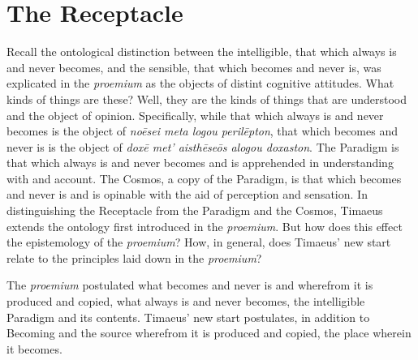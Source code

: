 

\section{The Receptacle} %
\label{sec:the_receptacle}



Recall the ontological distinction between the intelligible, that which always is and never becomes, and the sensible, that which becomes and never is, was explicated in the \emph{proemium} as the objects of distint cognitive attitudes. What kinds of things are these? Well, they are the kinds of things that are understood and the object of opinion. Specifically, while that which always is and never becomes is the object of \emph{noēsei meta logou perilēpton}, that which becomes and never is is the object of \emph{doxē met’ aisthēseōs alogou doxaston}. The Paradigm is that which always is and never becomes and is apprehended in understanding with and account. The Cosmos, a copy of the Paradigm, is that which becomes and never is and is opinable with the aid of perception and sensation. In distinguishing the Receptacle from the Paradigm and the Cosmos, Timaeus extends the ontology first introduced in the \emph{proemium}. But how does this effect the epistemology of the \emph{proemium}? How, in general, does Timaeus' new start relate to the principles laid down in the \emph{proemium}?

The \emph{proemium} postulated what becomes and never is and wherefrom it is produced and copied, what always is and never becomes, the intelligible Paradigm and its contents. Timaeus' new start postulates, in addition to Becoming and the source wherefrom it is produced and copied, the place wherein it becomes.

